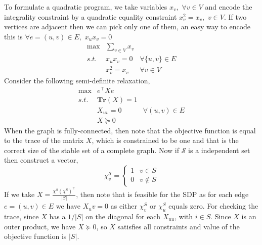 \documentclass{article}
\numberwithin{equation}{section}
\numberwithin{theorem}{section}
\numberwithin{lemma}{section}
\newcommand{\roundBrace}[1]{\left(#1\right)}
\newcommand{\card}[1]{\left|#1\right|}
\begin{document}
To formulate a quadratic program, we take variables $x_v, \, \, \forall v \in V$ and encode the integrality constraint by a quadratic equality constraint $x_v^2 = x_v, \, \, v \in V$. If two vertices are adjacent then we can pick only one of them, an easy way to encode this is $\forall e=(u, v) \in E, \, \, x_u x_v = 0$
\begin{equation}
    \begin{array}{ccc}
        \max& \sum_{v \in V} x_v&  \\
        s.t.& x_u x_v = 0 &\forall \{u,v\}\in E\\
        & x_v^2 = x_v & \forall v \in V
    \end{array}
\end{equation}
Consider the following semi-definite relaxation, 
\begin{equation}
    \begin{array}{ccc}
        \max& e^\top X e&  \\
        s.t.& \mathbf{Tr}\roundBrace{X} = 1\\
        & X_{uv} = 0 & \forall (u, v) \in E\\
        &X \succcurlyeq 0&
    \end{array}
\end{equation}
When the graph is fully-connected, then note that the objective function is equal to the trace of the matrix $X$, which is constrained to be one and that is the correct size of the stable set of a complete graph. Now if $\mathcal{S}$ is a independent set then construct a vector, 
\begin{equation}
    \chi^\mathcal{S}_v = \begin{cases}
        1& v \in S\\
        0& v \notin S
    \end{cases}
\end{equation}
If we take $X = \frac{\chi^S ({\chi^S})^\top}{\card{S}}$, then note that is feasible for the SDP as for each edge $e = (u, v) \in E$ we have $X_uv = 0$ as either $\chi^S_v$ or $\chi^S_u$ equals zero. For checking the trace, since $X$ has a $1/\card{S}$ on the diagonal for each $X_{uu}$, with $i \in S$. Since $X$ is an outer product, we have $X\succcurlyeq 0$, so $X$ satisfies all constraints and value of the objective function is $\card{S}$. 
\end{document}
